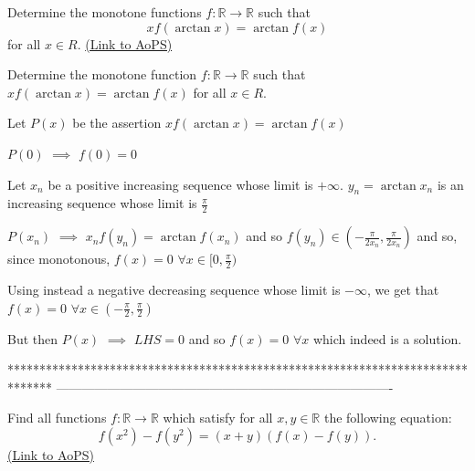 \begin{problem}
	Determine the  monotone functions $f: \mathbb{R}\to\mathbb{R}$ such that \[xf(\arctan x)=\arctan f(x)\] for all $x\in{R}$.
	\flushright \href{https://artofproblemsolving.com/community/c6h446794}{(Link to AoPS)}
\end{problem}



\begin{solution}
	\begin{tcolorbox}Determine the  monotone function $f: \mathbb{R}\to\mathbb{R}$ such that $xf(\arctan x)=\arctan f(x)$ for all $x\in{R}$.\end{tcolorbox}
Let $P(x)$ be the assertion $xf(\arctan x)=\arctan f(x)$

$P(0)$ $\implies$ $f(0)=0$

Let $x_n$ be a positive increasing sequence whose limit is $+\infty$. $y_n=\arctan x_n$ is an increasing sequence whose limit is $\frac{\pi}2$

$P(x_n)$ $\implies$ $x_nf(y_n)=\arctan f(x_n)$ and so $f(y_n)\in(-\frac{\pi}{2x_n},\frac{\pi}{2x_n})$ and so, since monotonous, $f(x)=0$ $\forall x\in[0,\frac{\pi}2)$

Using instead a negative decreasing sequence whose limit is $-\infty$, we get that $f(x)=0$ $\forall x\in(-\frac{\pi}2,\frac{\pi}2)$

But then $P(x)$ $\implies$ $LHS=0$ and so $\boxed{f(x)=0}$ $\forall x$ which indeed is a solution.
\end{solution}
*******************************************************************************
-------------------------------------------------------------------------------

\begin{problem}
	Find all functions $f:\mathbb{R}\to\mathbb{R}$ which satisfy for all $x,y \in \mathbb{R}$ the following equation: 
\[ f(x^{2})-f(y^{2})=(x+y)(f(x)-f(y)).\]
	\flushright \href{https://artofproblemsolving.com/community/c6h446818}{(Link to AoPS)}
\end{problem}



